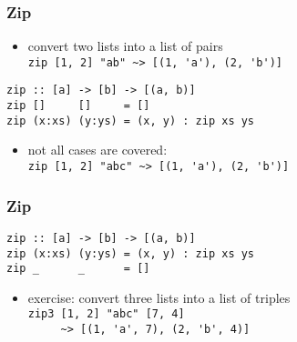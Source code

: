 \documentclass[dvipsnames]{beamer}
\theoremstyle{plain}
\begin{document}
\begin{frame}[fragile]
  \frametitle{Zip}

  \begin{itemize}
    \item convert two lists into a list of pairs\\
      \lstinline[style=exclamfix]|zip [1, 2] "ab" ~> [(1, 'a'), (2, 'b')]|
  \end{itemize}

  \begin{exampleblock}{}
    \begin{lstlisting}[deletekeywords={zip}]
zip :: [a] -> [b] -> [(a, b)]
zip []     []     = []
zip (x:xs) (y:ys) = (x, y) : zip xs ys
    \end{lstlisting}
  \end{exampleblock}

  \pause
  \begin{itemize}
    \item not all cases are covered:\\
      \lstinline[style=exclamfix]|zip [1, 2] "abc" ~> [(1, 'a'), (2, 'b')]|
  \end{itemize}
\end{frame}

\begin{frame}[fragile]
  \frametitle{Zip}

  \begin{exampleblock}{}
    \begin{lstlisting}[deletekeywords={zip}]
zip :: [a] -> [b] -> [(a, b)]
zip (x:xs) (y:ys) = (x, y) : zip xs ys
zip _      _      = []
    \end{lstlisting}
  \end{exampleblock}

  \pause
  \begin{itemize}
    \item exercise: convert three lists into a list of triples\\
      \lstinline[style=exclamfix]|zip3 [1, 2] "abc" [7, 4]|\\
      \lstinline[style=exclamfix]|     ~> [(1, 'a', 7), (2, 'b', 4)]|
  \end{itemize}
\end{frame}
\end{document}
